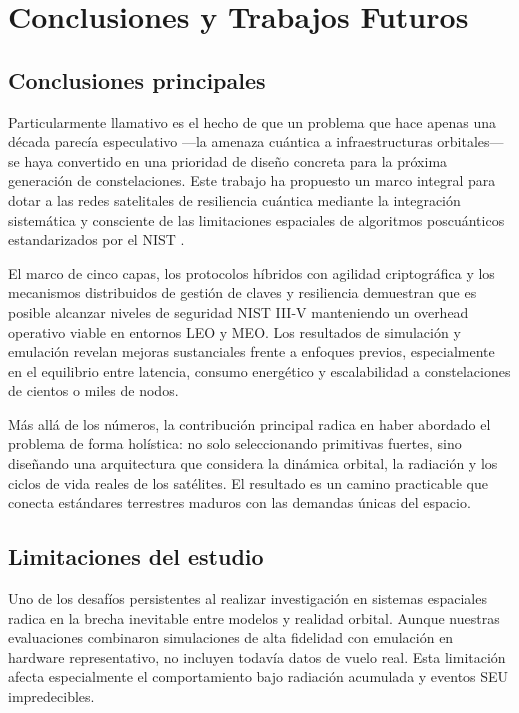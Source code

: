 \section{Conclusiones y Trabajos Futuros}

\subsection{Conclusiones principales}

Particularmente llamativo es el hecho de que un problema que hace apenas una década parecía especulativo —la amenaza cuántica a infraestructuras orbitales— se haya convertido en una prioridad de diseño concreta para la próxima generación de constelaciones. Este trabajo ha propuesto un marco integral para dotar a las redes satelitales de resiliencia cuántica mediante la integración sistemática y consciente de las limitaciones espaciales de algoritmos poscuánticos estandarizados por el NIST \cite{NIST_PQC2024}.

El marco de cinco capas, los protocolos híbridos con agilidad criptográfica y los mecanismos distribuidos de gestión de claves y resiliencia demuestran que es posible alcanzar niveles de seguridad NIST III-V manteniendo un overhead operativo viable en entornos LEO y MEO. Los resultados de simulación y emulación revelan mejoras sustanciales frente a enfoques previos, especialmente en el equilibrio entre latencia, consumo energético y escalabilidad a constelaciones de cientos o miles de nodos. 

Más allá de los números, la contribución principal radica en haber abordado el problema de forma holística: no solo seleccionando primitivas fuertes, sino diseñando una arquitectura que considera la dinámica orbital, la radiación y los ciclos de vida reales de los satélites. El resultado es un camino practicable que conecta estándares terrestres maduros con las demandas únicas del espacio.

\subsection{Limitaciones del estudio}

Uno de los desafíos persistentes al realizar investigación en sistemas espaciales radica en la brecha inevitable entre modelos y realidad orbital. Aunque nuestras evaluaciones combinaron simulaciones de alta fidelidad con emulación en hardware representativo, no incluyen todavía datos de vuelo real. Esta limitación afecta especialmente el comportamiento bajo radiación acumulada y eventos SEU impredecibles.

